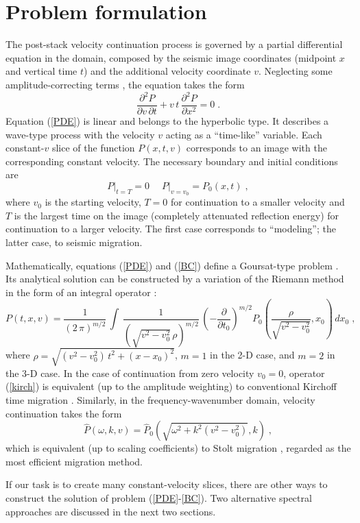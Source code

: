 \section{Problem formulation}
\par
The post-stack velocity continuation process is governed by a partial
differential equation in the domain, composed by the seismic image
coordinates (midpoint $x$ and vertical time $t$) and the additional
velocity coordinate $v$. Neglecting some amplitude-correcting terms
\cite[]{Fomel.sep.92.159}, the equation takes the form
\cite[]{Claerbout.sep.48.79}
\begin{equation}
  \frac{\partial^2 P}{\partial v\, \partial t} +
  v\,t\,\frac{\partial^2 P}{\partial x^2} = 0\;.
  \label{PDE}
\end{equation}
Equation (\ref{PDE}) is linear and belongs to the hyperbolic type. It
describes a wave-type process with the velocity $v$ acting as a
``time-like'' variable. Each constant-$v$ slice of the function
$P(x,t,v)$ corresponds to an image with the corresponding constant
velocity. The necessary boundary and initial conditions are 
\begin{equation}
  \label{BC}
  \left.P\right|_{t=T} = 0\;\quad \left.P\right|_{v=v_0} = P_0 (x,t)\;,
\end{equation}
where $v_0$ is the starting velocity, $T=0$ for continuation to a
smaller velocity and $T$ is the largest time on the image (completely
attenuated reflection energy) for continuation to a larger velocity.
The first case corresponds to ``modeling''; the latter case, to
seismic migration.
\par
Mathematically, equations (\ref{PDE}) and (\ref{BC}) define a
Goursat-type problem \cite[]{kurant}. Its analytical solution can be
constructed by a variation of the Riemann method in the form of an
integral operator \cite[]{me,Fomel.sep.92.159}:
\begin{equation}
  P(t,x,v) = \frac{1}{(2\,\pi)^{m/2}}\,\int\, 
  \frac{1}{(\sqrt{v^2-v_0^2}\,\rho)^{m/2}}\, 
  \left(- \frac{\partial}{\partial t_0}\right)^{m/2}
  P_0\left(\frac{\rho}{\sqrt{v^2-v_0^2}},x_0\right)\,dx_0\;,
  \label{kirch}
\end{equation}
where $\rho = \sqrt{(v^2-v_0^2)\,t^2 + (x - x_0)^2}$, $m=1$ in the 2-D
case, and $m=2$ in the 3-D case. In the case of continuation from zero
velocity $v_0=0$, operator (\ref{kirch}) is equivalent (up to the
amplitude weighting) to conventional Kirchoff time migration
\cite[]{GEO43-01-00490076}.  Similarly, in the frequency-wavenumber
domain, velocity continuation takes the form
\begin{equation}
  \label{stolt}
  \hat{P} (\omega,k,v) = \hat{P}_0 (\sqrt{\omega^2+k^2 (v^2-v_0^2)},k)\;,
\end{equation}
which is equivalent (up to scaling coefficients) to Stolt migration
\cite[]{GEO50-11-22192244}, regarded as the most efficient migration
method.
\par
If our task is to create many constant-velocity slices, there are
other ways to construct the solution of problem (\ref{PDE}-\ref{BC}).
Two alternative spectral approaches are discussed in the next two
sections.
\par
